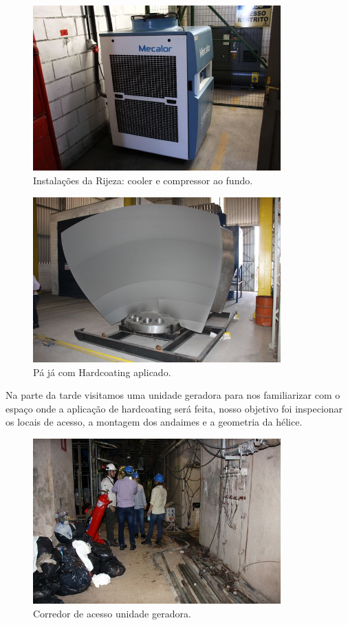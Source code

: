 \documentclass{article}
\begin{document}
\begin{figure}[H]
\centering
\includegraphics[width=0.85\textwidth]{Fotos/img_4852.jpg}
\caption{Instalações da Rijeza: cooler e compressor ao fundo.}
\end{figure}
\begin{figure}[H]
\centering
\includegraphics[width=0.85\textwidth]{Fotos/img_4886.jpg}
\caption{Pá já com Hardcoating aplicado.}
\end{figure}

Na parte da tarde visitamos uma unidade geradora para nos familiarizar com o
espaço onde a aplicação de hardcoating será feita, nosso objetivo foi inspecionar os locais 
de acesso, a montagem dos andaimes e a geometria da hélice.

\begin{figure}[H]
\centering
\includegraphics[width=0.85\textwidth]{Fotos/img_4905.jpg}
\caption{Corredor de acesso unidade geradora.}
\end{figure}
\end{document}
